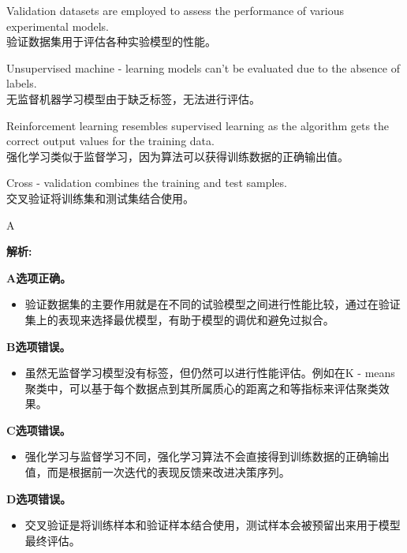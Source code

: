 \documentclass{article}
\newenvironment{explanation}
{\textbf{解析:}\par}
{\par}
\begin{document}
    \begin{choices}
        \item Validation datasets are employed to assess the performance of various experimental models.\\
        验证数据集用于评估各种实验模型的性能。
        \item Unsupervised machine - learning models can't be evaluated due to the absence of labels.\\
        无监督机器学习模型由于缺乏标签，无法进行评估。
        \item Reinforcement learning resembles supervised learning as the algorithm gets the correct output values for the training data.\\
        强化学习类似于监督学习，因为算法可以获得训练数据的正确输出值。
        \item Cross - validation combines the training and test samples.\\
        交叉验证将训练集和测试集结合使用。
    \end{choices}
    
    \begin{correctanswer}
        A
    \end{correctanswer}
    
    \begin{explanation}
    \textbf{A选项正确。}
    \begin{itemize}
        \item 验证数据集的主要作用就是在不同的试验模型之间进行性能比较，通过在验证集上的表现来选择最优模型，有助于模型的调优和避免过拟合。
    \end{itemize}
    \textbf{B选项错误。}
    \begin{itemize}
        \item 虽然无监督学习模型没有标签，但仍然可以进行性能评估。例如在K - means聚类中，可以基于每个数据点到其所属质心的距离之和等指标来评估聚类效果。
    \end{itemize}
    \textbf{C选项错误。}
    \begin{itemize}
        \item 强化学习与监督学习不同，强化学习算法不会直接得到训练数据的正确输出值，而是根据前一次迭代的表现反馈来改进决策序列。
    \end{itemize}
    \textbf{D选项错误。}
    \begin{itemize}
        \item 交叉验证是将训练样本和验证样本结合使用，测试样本会被预留出来用于模型最终评估。
    \end{itemize}
    \end{explanation}
    
\end{document}
